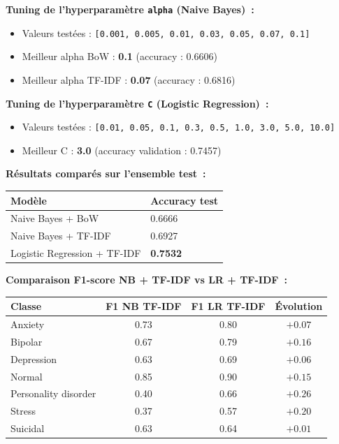 \documentclass[12pt,a4paper]{article}
\begin{document}
\textbf{Tuning de l'hyperparamètre \texttt{alpha} (Naive Bayes)~:}
\begin{itemize}
  \item Valeurs testées : \texttt{[0.001, 0.005, 0.01, 0.03, 0.05, 0.07, 0.1]}
  \item Meilleur alpha BoW : \textbf{0.1} (accuracy : 0.6606)
  \item Meilleur alpha TF-IDF : \textbf{0.07} (accuracy : 0.6816)
\end{itemize}

\textbf{Tuning de l'hyperparamètre \texttt{C} (Logistic Regression)~:}
\begin{itemize}
  \item Valeurs testées : \texttt{[0.01, 0.05, 0.1, 0.3, 0.5, 1.0, 3.0, 5.0, 10.0]}
  \item Meilleur C : \textbf{3.0} (accuracy validation : 0.7457)
\end{itemize}

\textbf{Résultats comparés sur l'ensemble test~:}

\begin{center}
\begin{tabular}{ll}
\toprule
\textbf{Modèle} & \textbf{Accuracy test} \\
\midrule
Naive Bayes + BoW            & 0.6666 \\
Naive Bayes + TF-IDF         & 0.6927 \\
Logistic Regression + TF-IDF & \textbf{0.7532} \\
\bottomrule
\end{tabular}
\end{center}

\textbf{Comparaison F1-score NB + TF-IDF vs LR + TF-IDF~:}

\begin{center}
\begin{tabular}{lccc}
\toprule
\textbf{Classe} & \textbf{F1 NB TF-IDF} & \textbf{F1 LR TF-IDF} & \textbf{Évolution} \\
\midrule
Anxiety              & 0.73 & 0.80 & $+0.07$ \\
Bipolar              & 0.67 & 0.79 & $+0.16$ \\
Depression           & 0.63 & 0.69 & $+0.06$ \\
Normal               & 0.85 & 0.90 & $+0.15$ \\
Personality disorder & 0.40 & 0.66 & $\mathbf{+0.26}$ \\
Stress               & 0.37 & 0.57 & $\mathbf{+0.20}$ \\
Suicidal             & 0.63 & 0.64 & $+0.01$ \\
\bottomrule
\end{tabular}
\end{center}
\end{document}
